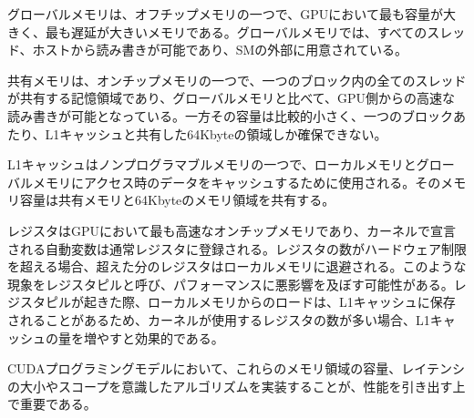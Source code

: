 \documentclass[a4paper,11pt,oneside,openany]{jsbook}
\begin{document}
グローバルメモリは、オフチップメモリの一つで、GPUにおいて最も容量が大きく、最も遅延が大きいメモリである。グローバルメモリでは、すべてのスレッド、ホストから読み書きが可能であり、SMの外部に用意されている。

共有メモリは、オンチップメモリの一つで、一つのブロック内の全てのスレッドが共有する記憶領域であり、グローバルメモリと比べて、GPU側からの高速な読み書きが可能となっている。一方その容量は比較的小さく、一つのブロックあたり、L1キャッシュと共有した64Kbyteの領域しか確保できない。

L1キャッシュはノンプログラマブルメモリの一つで、ローカルメモリとグローバルメモリにアクセス時のデータをキャッシュするために使用される。そのメモリ容量は共有メモリと64Kbyteのメモリ領域を共有する。

レジスタはGPUにおいて最も高速なオンチップメモリであり、カーネルで宣言される自動変数は通常レジスタに登録される。レジスタの数がハードウェア制限を超える場合、超えた分のレジスタはローカルメモリに退避される。このような現象をレジスタピルと呼び、パフォーマンスに悪影響を及ぼす可能性がある。レジスタピルが起きた際、ローカルメモリからのロードは、L1キャッシュに保存されることがあるため、カーネルが使用するレジスタの数が多い場合、L1キャッシュの量を増やすと効果的である。

CUDAプログラミングモデルにおいて、これらのメモリ領域の容量、レイテンシの大小やスコープを意識したアルゴリズムを実装することが、性能を引き出す上で重要である。


\end{document}
